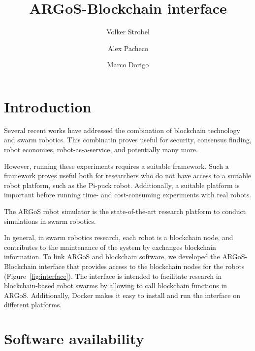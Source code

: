 \documentclass{article}
\title{ARGoS-Blockchain interface}
\author{Volker Strobel \and Alex Pacheco \and Marco Dorigo}
\begin{document}
\maketitle

\section{Introduction}

Several recent works have addressed the combination of blockchain
technology and swarm robotics. This combinatin proves useful for
security, consensus finding, robot economies, robot-as-a-service, and
potentially many more.

However, running these experiments requires a suitable framework. Such
a framework proves useful both for researchers who do not have access
to a suitable robot platform, such as the Pi-puck robot. Additionally,
a suitable platform is important before running time- and
cost-consuming experiments with real robots.

The ARGoS robot simulator \citep{PinTriOGr-etal2012:si} is the
state-of-the-art research platform to conduct simulations in swarm
robotics.

In general, in swarm robotics research, each robot is a blockchain
node, and contributes to the maintenance of the system by exchanges
blockchain information. To link ARGoS and blockchain software, we
developed the ARGoS-Blockchain interface that provides access to the
blockchain nodes for the robots (Figure~\ref{fig:interface}). The
interface is intended to facilitate research in blockchain-based robot
swarms by allowing to call blockchain functions in
ARGoS. Additionally, Docker makes it easy to install and run the
interface on different platforms.


\section{Software availability}




\end{document}
